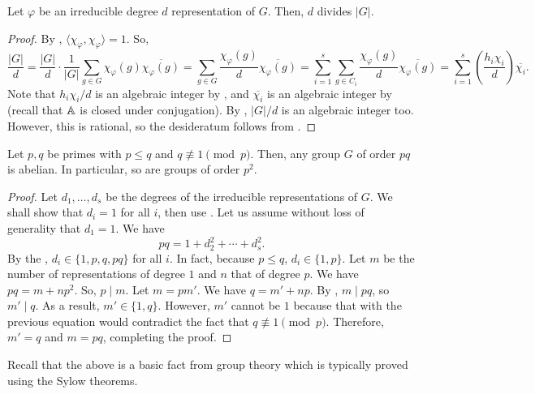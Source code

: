 	\begin{ftheo}
		\label{theo: dimension th}
		Let $\varphi$ be an irreducible degree $d$ representation of $G$. Then, $d$ divides $|G|$.
	\end{ftheo}
	\begin{proof}
		By , $\langle \chi_\varphi , \chi_\varphi \rangle = 1$. So,
		\[ \frac{|G|}{d} = \frac{|G|}{d} \cdot \frac{1}{|G|} \sum_{g \in G} \chi_\varphi(g) \overline{\chi_\varphi(g)} = \sum_{g \in G} \frac{\chi_\varphi(g)}{d} \overline{\chi_\varphi(g)} = \sum_{i=1}^s \sum_{g \in C_i} \frac{\chi_\varphi(g)}{d} \overline{\chi_\varphi(g)} = \sum_{i=1}^s \left( \frac{h_i\chi_i}{d} \right) \overline{\chi_i}. \]
		Note that $h_i \chi_i / d$ is an algebraic integer by , and $\overline{\chi_i}$ is an algebraic integer by  (recall that $\mathbb{A}$ is closed under conjugation). By , $|G|/d$ is an algebraic integer too. However, this is rational, so the desideratum follows from .
	\end{proof}

	\begin{fcor}
		Let $p,q$ be primes with $p \le q$ and $q \not\equiv 1 \pmod p$. Then, any group $G$ of order $pq$ is abelian. In particular, so are groups of order $p^2$.
	\end{fcor}
	\begin{proof}
		Let $d_1,\ldots,d_s$ be the degrees of the irreducible representations of $G$. We shall show that $d_i = 1$ for all $i$, then use . Let us assume without loss of generality that $d_1 = 1$. We have
		\[ pq = 1 + d_2^2 + \cdots + d_s^2. \]
		By the , $d_i \in \{1,p,q,pq\}$ for all $i$. In fact, because $p \le q$, $d_i \in \{1,p\}$. Let $m$ be the number of representations of degree $1$ and $n$ that of degree $p$. We have $pq = m + np^2$. So, $p \mid m$. Let $m = pm'$. We have $q = m' + np$. By , $m \mid pq$, so $m' \mid q$. As a result, $m'\in\{1,q\}$. However, $m'$ cannot be $1$ because that with the previous equation would contradict the fact that $q \not\equiv 1 \pmod p$. Therefore, $m' = q$ and $m = pq$, completing the proof.
	\end{proof}

	Recall that the above is a basic fact from group theory which is typically proved using the Sylow theorems.

